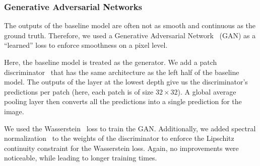     \subsubsection{Generative Adversarial Networks}
    The outputs of the baseline model are often not as smooth and continuous as the ground truth.
    Therefore, we used a Generative Adversarial Network~\cite{gan} (GAN) as a ``learned'' loss to enforce smoothness on a pixel level.

    Here, the baseline model is treated as the generator.
    We add a patch discriminator~\cite{pix2pix} that has the same architecture as the left half of the baseline model.
    The outputs of the layer at the lowest depth give us the discriminator's predictions per patch (here, each patch is of size $32 \times 32$).
    A global average pooling layer then converts all the predictions into a single prediction for the image.
    
    We used the Wasserstein~\cite{wgan} loss to train the GAN.
    Additionally, we added spectral normalization~\cite{spectral-norm} to the weights of the discriminator to enforce the Lipschitz continuity constraint for the Wasserstein loss. Again, no improvements were noticeable, while leading to longer training times.